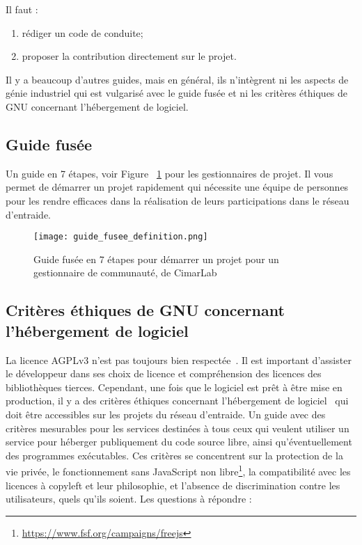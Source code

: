 Il faut :
\begin{enumerate}
    \item rédiger un code de conduite;
    \item proposer la contribution directement sur le projet.
\end{enumerate}

Il y a beaucoup d'autres guides, mais en général, ils n'intègrent ni les aspects de génie industriel qui est vulgarisé avec le guide fusée et ni les critères éthiques de GNU concernant l’hébergement de logiciel.

\subsection{Guide fusée}

Un guide en 7 étapes, voir Figure ~\ref{fig:guide_fusee} pour les gestionnaires de projet. Il vous permet de démarrer un projet rapidement qui nécessite une équipe de personnes pour les rendre efficaces dans la réalisation de leurs participations dans le réseau d’entraide.


\begin{figure}[htb]
\centering
\texttt{[image: guide\_fusee\_definition.png]}
\caption{Guide fusée en 7 étapes pour démarrer un projet pour un gestionnaire de communauté, de CimarLab~\cite{guide_fusee}}
\label{fig:guide_fusee}
\end{figure}

\subsection{Critères éthiques de GNU concernant l'hébergement de logiciel}

La licence AGPLv3 n’est pas toujours bien respectée~\cite{violation_libre_2017}. Il est important d'assister le développeur dans ses choix de licence et compréhension des licences des bibliothèques tierces. Cependant, une fois que le logiciel est prêt à être mise en production, il y a des critères éthiques concernant l'hébergement de logiciel~\cite{gnu_critere_hebergement_2022} qui doit être accessibles sur les projets du réseau d’entraide. Un guide avec des critères mesurables pour les services destinées à tous ceux qui veulent utiliser un service pour héberger publiquement du code source libre, ainsi qu'éventuellement des programmes exécutables. Ces critères se concentrent sur la protection de la vie privée, le fonctionnement sans JavaScript non libre\footnote{\url{https://www.fsf.org/campaigns/freejs}}, la compatibilité avec les licences à copyleft et leur philosophie, et l'absence de discrimination contre les utilisateurs, quels qu'ils soient.  Les questions à répondre : 

